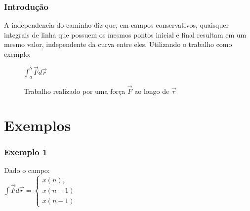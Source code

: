 \documentclass{beamer}
\begin{document}
\begin{frame}
    \frametitle{Introdução}
    A independencia do caminho diz que, em campos conservativos, quaisquer integrais de linha que possuem os mesmos pontos inicial e final resultam em um mesmo valor, independente da curva 
    entre eles. Utilizando o trabalho como exemplo:
    \begin{figure}
    $
        \mathit{\int_{a}^b \overrightarrow{F} d\overrightarrow{r}}
    $
    \caption{Trabalho realizado por uma força $\vec{F}$ ao longo de $\vec{r}$} \label{fig:1}
    \end{figure}

\end{frame}

\section{Exemplos}

\begin{frame}
    \frametitle{Exemplo 1} 

        Dado o campo:\\
        
            $
            \int{} \vec{F} d\vec{r} =  
            \begin{cases}
            x(n),\\
            x(n-1)\\
            x(n-1)
            \end{cases}
            $
        
%     
%     
%     

\end{frame}

\frame{\printbibliography}
\end{document}
